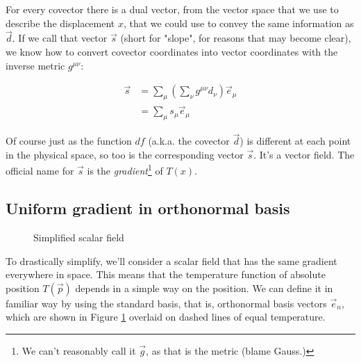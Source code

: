 For every covector there is a dual vector, from the vector space that we use to describe the displacement $x$, that we could use to convey the same information as $\vec{d}$. If we call that vector $\vec{s}$ (short for "slope", for reasons that may become clear), we know how to convert covector coordinates into vector coordinates with the inverse metric $g^{\mu\nu}$:

\begin{equation}
\begin{split}
\vec{s} 
&= \sum_{\mu} \left( \sum_{\nu} g^{\mu\nu} d_{\nu} \right) \vec{e}_{\mu} \\
&= \sum_{\mu} s_{\mu} \vec{e}_{\mu}
\label{eqn:vector-gradient}
\end{split}
\end{equation}

Of course just as the function $df$ (a.k.a. the covector $\vec{d}$) is different at each point in the physical space, so too is the corresponding vector $\vec{s}$. It's a vector field. The official name for $\vec{s}$ is the \textit{gradient}\footnote{We can't reasonably call it $\vec{g}$, as that is the metric (blame Gauss.)} of $T(x)$.

\subsection{Uniform gradient in orthonormal basis}

\begin{figure}[h]
    \caption{Simplified scalar field}
    \centering
    \label{fig:scalar-field-std-basis}
\end{figure}

To drastically simplify, we'll consider a scalar field that has the same gradient everywhere in space. This means that the temperature function of absolute position $T(\vec{p})$ depends in a simple way on the position. We can define it in familiar way by using the standard basis, that is, orthonormal basis vectors $\vec{e}_n$, which are shown in Figure \ref{fig:scalar-field-std-basis} overlaid on dashed lines of equal temperature.

